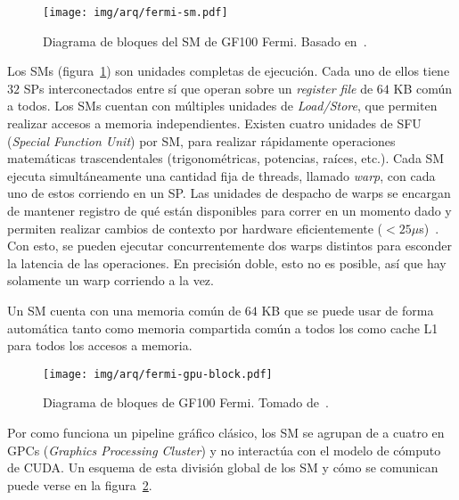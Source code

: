 \begin{figure}[htbp]
    \centering
    \texttt{[image: img/arq/fermi-sm.pdf]}
    \caption{Diagrama de bloques del SM de GF100 Fermi. Basado en~\cite{NvidiaFermi}.}
    \label{fermi_sm}
\end{figure}

Los SMs (figura~\ref{fermi_sm}) son unidades completas de ejecuci\'on.
Cada uno de ellos tiene $32$ SPs interconectados entre s\'i que operan sobre un \emph{register file} de $64$ KB com\'un a todos.
Los SMs cuentan con m\'ultiples unidades de \emph{Load/Store}, que permiten realizar accesos a memoria independientes.
Existen cuatro unidades de SFU (\textit{Special Function Unit}) por SM, para realizar r\'apidamente operaciones matem\'aticas trascendentales (trigonom\'etricas, potencias, ra\'ices, etc.).
Cada SM ejecuta simult\'aneamente una cantidad fija de threads, llamado \textit{warp}, con cada uno de estos corriendo en un SP.
Las unidades de despacho de warps se encargan de mantener registro de qu\'e \threads{} est\'an disponibles para correr en un momento dado y permiten realizar cambios de contexto por hardware
eficientemente ($<25 \mu$s)~\cite{PattersonFermi}.
Con esto, se pueden ejecutar concurrentemente dos warps distintos para esconder la latencia de las operaciones.
En precisi\'on doble, esto no es posible, as\'i que hay solamente un warp corriendo a la vez.

Un SM cuenta con una memoria com\'un de $64$ KB que se puede usar de forma autom\'atica tanto como memoria compartida com\'un a todos los \threads{} como cache L1 para todos los accesos a memoria.

\begin{figure}[htbp]
    \centering
    \texttt{[image: img/arq/fermi-gpu-block.pdf]}
    \caption{Diagrama de bloques de GF100 Fermi. Tomado de~\cite{NvidiaFermi}.}
    \label{fermi_gpu_block}
\end{figure}

Por como funciona un pipeline gr\'afico cl\'asico, los SM se agrupan de a cuatro en GPCs (\textit{Graphics Processing Cluster}) y no interact\'ua con el modelo de c\'omputo
de CUDA.
Un esquema de esta divisi\'on global de los SM y c\'omo se comunican puede verse en la figura~\ref{fermi_gpu_block}.


